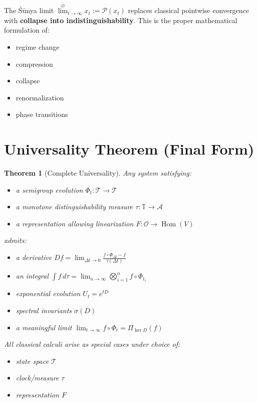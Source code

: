 \documentclass[12pt, oneside]{article}
\newtheorem{theorem}{Theorem}[section]
\DeclareMathOperator{\Hom}{Hom}
\newcommand{\A}{\mathcal{A}}
\newcommand{\T}{\mathcal{T}}
\newcommand{\Opr}{\mathcal{O}}
\begin{document}
The Śūnya limit $\overset{\varnothing}{\lim}_{t \to \infty} x_t := \mathcal{P}(x_t)$ replaces classical pointwise convergence with \textbf{collapse into indistinguishability}. This is the proper mathematical formulation of:
\begin{itemize}
    \item regime change
    \item compression
    \item collapse
    \item renormalization
    \item phase transitions
\end{itemize}

\section{Universality Theorem (Final Form)}

\begin{theorem}[Complete Universality]
Any system satisfying:
\begin{itemize}
    \item a semigroup evolution $\Phi_t: \T \rightarrow \T$
    \item a monotone distinguishability measure $\tau: \mathbb{T} \rightarrow \A$
    \item a representation allowing linearization $F: \Opr \rightarrow \Hom(V)$
\end{itemize}
admits:
\begin{itemize}
    \item a derivative $Df = \lim_{\Delta t \to 0} \frac{f \circ \Phi_{\Delta t} - f}{\tau(\Delta t)}$
    \item an integral $\int f \, d\tau = \lim_{n \to \infty} \bigotimes_{i=1}^n f \circ \Phi_{t_i}$
    \item exponential evolution $U_t = e^{tD}$
    \item spectral invariants $\sigma(D)$
    \item a meaningful limit $\lim_{t \to \infty} f \circ \Phi_t = \Pi_{\ker D}(f)$
\end{itemize}
All classical calculi arise as special cases under choice of:
\begin{itemize}
    \item state space $\T$
    \item clock/measure $\tau$
    \item representation $F$
\end{itemize}
\end{theorem}
\end{document}
